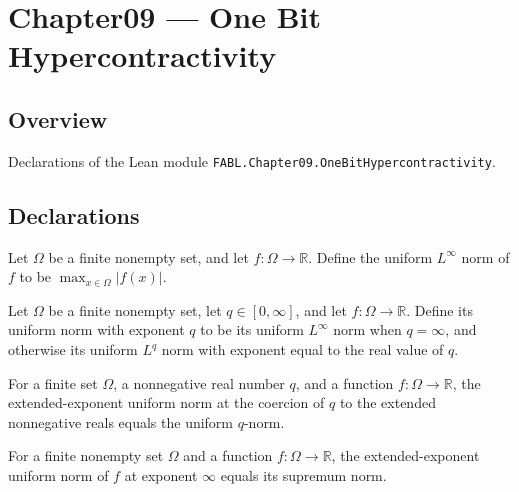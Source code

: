 \chapter{Chapter09 — One Bit Hypercontractivity}
\section{Overview}

Declarations of the Lean module \texttt{FABL.Chapter09.OneBitHypercontractivity}.

\section{Declarations}

\begin{definition}
\label{FABL.uniformLInfinityNorm}
\leanok
Let $\Omega$ be a finite nonempty set, and let $f:\Omega\to\mathbb R$. Define the
uniform $L^\infty$ norm of $f$ to be $\max_{x\in\Omega}|f(x)|$.
\end{definition}

\begin{definition}
\label{FABL.uniformLpNormENNReal}
\leanok
{}
Let $\Omega$ be a finite nonempty set, let $q\in[0,\infty]$, and let $f:\Omega\to\mathbb
R$. Define its uniform norm with exponent $q$ to be its uniform $L^\infty$ norm when
$q=\infty$, and otherwise its uniform $L^q$ norm with exponent equal to the real value
of $q$.
\end{definition}

\begin{theorem}
\label{FABL.uniformLpNormENNReal_coe}
\leanok
{}
For a finite set $\Omega$, a nonnegative real number $q$, and a function
$f:\Omega\to\mathbb R$, the extended-exponent uniform norm at the coercion of $q$ to the
extended nonnegative reals equals the uniform $q$-norm.
\end{theorem}

\begin{theorem}
\label{FABL.uniformLpNormENNReal_top}
\leanok
{}
For a finite nonempty set $\Omega$ and a function $f:\Omega\to\mathbb R$, the
extended-exponent uniform norm of $f$ at exponent $\infty$ equals its supremum norm.
\end{theorem}

